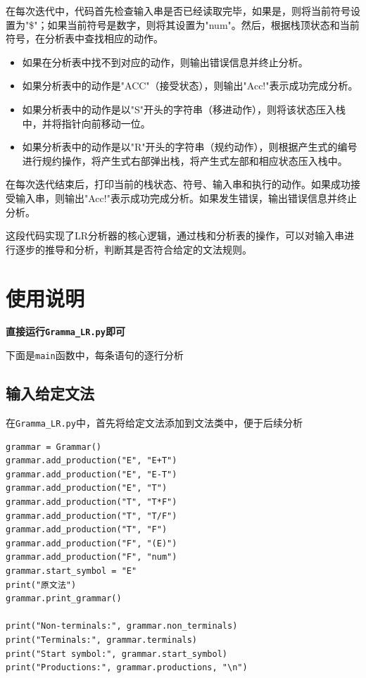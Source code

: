 \documentclass[lang=cn,11pt,a4paper]{elegantpaper}
\begin{document}
在每次迭代中，代码首先检查输入串是否已经读取完毕，如果是，则将当前符号设置为"\$"；如果当前符号是数字，则将其设置为"num"。然后，根据栈顶状态和当前符号，在分析表中查找相应的动作。
\begin{itemize}
    \item 如果在分析表中找不到对应的动作，则输出错误信息并终止分析。
    \item 如果分析表中的动作是"ACC"（接受状态），则输出"Acc!"表示成功完成分析。
    \item 如果分析表中的动作是以"S"开头的字符串（移进动作），则将该状态压入栈中，并将指针向前移动一位。
    \item 如果分析表中的动作是以"R"开头的字符串（规约动作），则根据产生式的编号进行规约操作，将产生式右部弹出栈，将产生式左部和相应状态压入栈中。
\end{itemize}

在每次迭代结束后，打印当前的栈状态、符号、输入串和执行的动作。如果成功接受输入串，则输出"Acc!"表示成功完成分析。如果发生错误，输出错误信息并终止分析。

这段代码实现了LR分析器的核心逻辑，通过栈和分析表的操作，可以对输入串进行逐步的推导和分析，判断其是否符合给定的文法规则。

\section{使用说明}

\textbf{直接运行\lstinline{Gramma_LR.py}即可}

下面是\lstinline{main}函数中，每条语句的逐行分析


\subsection{输入给定文法}
在\lstinline{Gramma_LR.py}中，首先将给定文法添加到文法类中，便于后续分析
\begin{lstlisting}
grammar = Grammar()
grammar.add_production("E", "E+T")
grammar.add_production("E", "E-T")
grammar.add_production("E", "T")
grammar.add_production("T", "T*F")
grammar.add_production("T", "T/F")
grammar.add_production("T", "F")
grammar.add_production("F", "(E)")
grammar.add_production("F", "num")
grammar.start_symbol = "E"
print("原文法")
grammar.print_grammar()

print("Non-terminals:", grammar.non_terminals)
print("Terminals:", grammar.terminals)
print("Start symbol:", grammar.start_symbol)
print("Productions:", grammar.productions, "\n")
\end{lstlisting}
\end{document}
